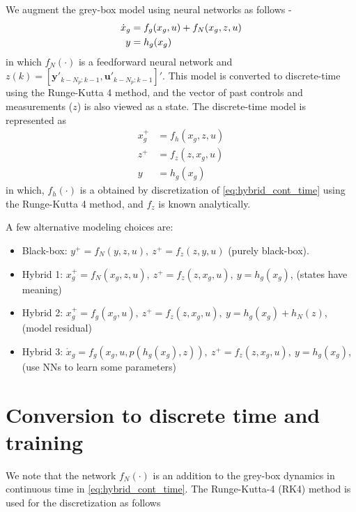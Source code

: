 \documentclass{article}
\begin{document}
We augment the grey-box model using neural networks as follows -
\begin{align} \label{eq:hybrid_cont_time}
\dot x_g &= f_g(x_g, u) + 
f_N(x_g, z, u) \notag \\
y &= h_g(x_g) 
\end{align}
in which $f_N(\cdot)$ is a feedforward neural network and $z(k) =
[\mathbf{y}'_{k-N_p:k-1}, \mathbf{u}'_{k-N_p:k-1}]'$. This model is converted to
discrete-time using the Runge-Kutta 4 method, and the vector of past controls
and measurements ($z$) is also viewed as a state. The discrete-time model is
represented as 
\begin{equation} \label{eq:hybrid_discrete_time}
  \begin{split}
    x_g^+ &= f_h(x_g, z, u)  \\
    z^+ &= f_z(z, x_g, u) \\
    y &= h_g(x_g)       
  \end{split}
\end{equation}
in which, $f_h(\cdot)$ is a obtained by discretization of
\eqref{eq:hybrid_cont_time} using the Runge-Kutta 4 method, and $f_z$ is known
analytically.

A few alternative modeling choices are:
\begin{itemize}
  \item Black-box: $y^+ = f_N(y, z, u), \ z^+ = f_z(z, y, u)$
        (purely black-box).
  \item Hybrid 1: $x_g^+ = f_N(x_g, z, u), \ z^+ = f_z(z, x_g, u), \ y =
                   h_g(x_g)$, (states have meaning)
  \item Hybrid 2: $x_g^+ = f_g(x_g, u), \ z^+ = f_z(z, x_g, u), \ y = h_g(x_g) +
                   h_N(z)$, (model residual)
  \item Hybrid 3: $\dot x_g = f_g(x_g, u, p(h_g(x_g), z)), \ z^+ = f_z(z, x_g,
  u), \ y = h_g(x_g)$, (use NNs to learn some parameters)
\end{itemize}

\section{Conversion to discrete time and training}
We note that the network $f_N(\cdot)$ is an addition to the grey-box dynamics in
continuous time in \eqref{eq:hybrid_cont_time}. The Runge-Kutta-4 (RK4) method
is used for the discretization as follows
\end{document}
